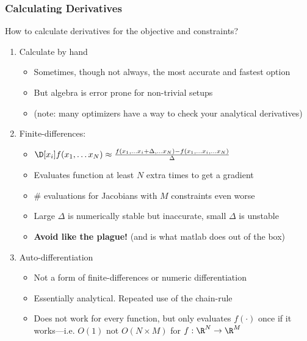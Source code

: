 \documentclass[nofootline]{etk-presentation}
\begin{document}
\begin{frame}[fragile]	\frametitle{Calculating Derivatives}
How to calculate derivatives for the objective and constraints?
\begin{enumerate}
	\item Calculate by hand
	\begin{itemize}
		\item Sometimes, though not always, the most accurate and fastest option
		\item But algebra is error prone for non-trivial setups
		\item (note: many optimizers have a way to check your analytical derivatives)
	\end{itemize}
\bigskip
	\item Finite-differences:
	\begin{itemize}
		\item $\D[x_i]f(x_1,\ldots x_N) \approx \frac{f(x_1,\ldots x_i + \Delta,\ldots x_N) - f(x_1,\ldots x_i,\ldots x_N)}{\Delta}$
		\item Evaluates function at least $N$ extra times to get a gradient
		\item \# evaluations for Jacobians with $M$ constraints even worse
		\item Large $\Delta$ is numerically stable but inaccurate, small $\Delta$ is unstable
		\item \textbf{Avoid like the plague!} (and is what matlab does out of the box)
	\end{itemize}
\bigskip
	\item Auto-differentiation
	\begin{itemize}
		\item Not a form of finite-differences or numeric differentiation
		\item Essentially analytical.  Repeated use of the chain-rule
		\item Does not work for every function, but only evaluates $f(\cdot)$ once if it works---i.e. $O(1)$ not $O(N\times M)$ for $f : \R^N \to \R^M$
	\end{itemize}
\end{enumerate}
\end{frame}
\end{document}
